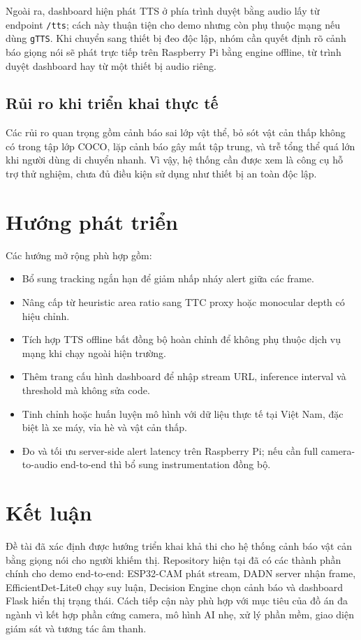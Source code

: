 \documentclass[oneside,final]{hcmut-report}
\begin{document}
Ngoài ra, dashboard hiện phát TTS ở phía trình duyệt bằng audio lấy từ endpoint \texttt{/tts}; cách này thuận tiện cho demo nhưng còn phụ thuộc mạng nếu dùng \texttt{gTTS}. Khi chuyển sang thiết bị đeo độc lập, nhóm cần quyết định rõ cảnh báo giọng nói sẽ phát trực tiếp trên Raspberry Pi bằng engine offline, từ trình duyệt dashboard hay từ một thiết bị audio riêng.

\subsection{Rủi ro khi triển khai thực tế}
Các rủi ro quan trọng gồm cảnh báo sai lớp vật thể, bỏ sót vật cản thấp không có trong tập lớp COCO, lặp cảnh báo gây mất tập trung, và trễ tổng thể quá lớn khi người dùng di chuyển nhanh. Vì vậy, hệ thống cần được xem là công cụ hỗ trợ thử nghiệm, chưa đủ điều kiện sử dụng như thiết bị an toàn độc lập.

\section{Hướng phát triển}

Các hướng mở rộng phù hợp gồm:
\begin{itemize}
  \item Bổ sung tracking ngắn hạn để giảm nhấp nháy alert giữa các frame.
  \item Nâng cấp từ heuristic area ratio sang TTC proxy hoặc monocular depth có hiệu chỉnh.
  \item Tích hợp TTS offline bất đồng bộ hoàn chỉnh để không phụ thuộc dịch vụ mạng khi chạy ngoài hiện trường.
  \item Thêm trang cấu hình dashboard để nhập stream URL, inference interval và threshold mà không sửa code.
  \item Tinh chỉnh hoặc huấn luyện mô hình với dữ liệu thực tế tại Việt Nam, đặc biệt là xe máy, vỉa hè và vật cản thấp.
  \item Đo và tối ưu server-side alert latency trên Raspberry Pi; nếu cần full camera-to-audio end-to-end thì bổ sung instrumentation đồng bộ.
\end{itemize}

\section{Kết luận}

Đề tài đã xác định được hướng triển khai khả thi cho hệ thống cảnh báo vật cản bằng giọng nói cho người khiếm thị. Repository hiện tại đã có các thành phần chính cho demo end-to-end: ESP32-CAM phát stream, DADN server nhận frame, EfficientDet-Lite0 chạy suy luận, Decision Engine chọn cảnh báo và dashboard Flask hiển thị trạng thái. Cách tiếp cận này phù hợp với mục tiêu của đồ án đa ngành vì kết hợp phần cứng camera, mô hình AI nhẹ, xử lý phần mềm, giao diện giám sát và tương tác âm thanh.
\end{document}
